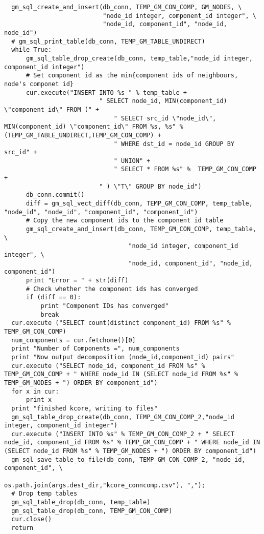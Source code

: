 \begin{lstlisting}
  gm_sql_create_and_insert(db_conn, TEMP_GM_CON_COMP, GM_NODES, \
                           "node_id integer, component_id integer", \
                           "node_id, component_id", "node_id, node_id")
  # gm_sql_print_table(db_conn, TEMP_GM_TABLE_UNDIRECT)
  while True:
      gm_sql_table_drop_create(db_conn, temp_table,"node_id integer, component_id integer")
      # Set component id as the min{component ids of neighbours, node's componet id}
      cur.execute("INSERT INTO %s " % temp_table +
                          " SELECT node_id, MIN(component_id) \"component_id\" FROM (" +
                              " SELECT src_id \"node_id\", MIN(component_id) \"component_id\" FROM %s, %s" % (TEMP_GM_TABLE_UNDIRECT,TEMP_GM_CON_COMP) +
                              " WHERE dst_id = node_id GROUP BY src_id" +
                              " UNION" +
                              " SELECT * FROM %s" %  TEMP_GM_CON_COMP +
                          " ) \"T\" GROUP BY node_id")
      db_conn.commit()
      diff = gm_sql_vect_diff(db_conn, TEMP_GM_CON_COMP, temp_table, "node_id", "node_id", "component_id", "component_id")
      # Copy the new component ids to the component id table
      gm_sql_create_and_insert(db_conn, TEMP_GM_CON_COMP, temp_table, \
                                  "node_id integer, component_id integer", \
                                  "node_id, component_id", "node_id, component_id")
      print "Error = " + str(diff)
      # Check whether the component ids has converged
      if (diff == 0):
          print "Component IDs has converged"
          break
  cur.execute ("SELECT count(distinct component_id) FROM %s" % TEMP_GM_CON_COMP)
  num_components = cur.fetchone()[0]
  print "Number of Components =", num_components
  print "Now output decomposition (node_id,component_id) pairs"
  cur.execute ("SELECT node_id, component_id FROM %s" % TEMP_GM_CON_COMP + " WHERE node_id IN (SELECT node_id FROM %s" % TEMP_GM_NODES + ") ORDER BY component_id")
  for x in cur:
      print x
  print "finished kcore, writing to files"
  gm_sql_table_drop_create(db_conn, TEMP_GM_CON_COMP_2,"node_id integer, component_id integer")
  cur.execute ("INSERT INTO %s" % TEMP_GM_CON_COMP_2 + " SELECT node_id, component_id FROM %s" % TEMP_GM_CON_COMP + " WHERE node_id IN (SELECT node_id FROM %s" % TEMP_GM_NODES + ") ORDER BY component_id")
  gm_sql_save_table_to_file(db_conn, TEMP_GM_CON_COMP_2, "node_id, component_id", \
                                os.path.join(args.dest_dir,"kcore_conncomp.csv"), ",");
  # Drop temp tables
  gm_sql_table_drop(db_conn, temp_table)
  gm_sql_table_drop(db_conn, TEMP_GM_CON_COMP)
  cur.close()
  return


\end{lstlisting}
